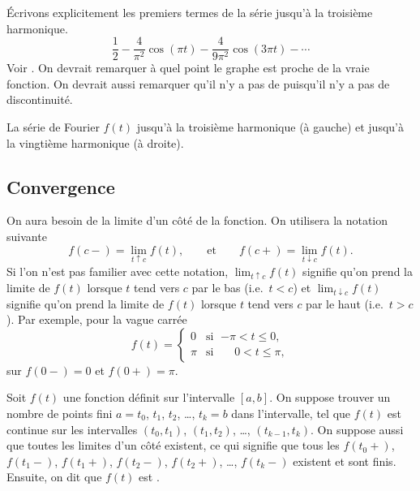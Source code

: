 \begin{example}
Écrivons explicitement les premiers termes de la série jusqu'à la troisième harmonique.
\begin{equation*}
\frac{1}{2} -
\frac{4}{\pi^2} \cos (\pi t)
-
\frac{4}{9 \pi^2} \cos (3 \pi t)
- \cdots
\end{equation*}
Voir .  On devrait remarquer à quel point le graphe est proche de la vraie fonction. On devrait aussi remarquer qu'il n'y a pas de 
 puisqu'il n'y a pas de discontinuité.

\begin{myfig}
\capstart
\caption{La série de Fourier $f(t)$ jusqu'à la troisième harmonique (à gauche)
et jusqu'à la vingtième harmonique (à droite).\label{gfs:sawcontfsfig}}
\end{myfig}
\end{example}

\subsection{Convergence}

On aura besoin de la limite d'un côté de la fonction. On utilisera la notation suivante 
\begin{equation*}
f(c-) = \lim_{t \uparrow c} f(t),
\qquad \text{et} \qquad
f(c+) = \lim_{t \downarrow c} f(t).
\end{equation*}
Si l'on n'est pas familier avec cette notation, 
$\lim_{t \uparrow c} f(t)$ signifie qu'on prend la limite de $f(t)$
lorsque $t$ tend vers $c$ par le bas (i.e.\ $t < c$) et
$\lim_{t \downarrow c} f(t)$ signifie qu'on prend la limite de $f(t)$
lorsque $t$ tend vers $c$ par le haut (i.e.\ $t > c$).
Par exemple, pour la vague carrée 
\begin{equation} \label{gfs:sqwaveeq}
f(t) =
\begin{cases}
0 & \text{si } \; {-\pi} < t \leq 0 , \\
\pi & \text{si } \; \phantom{-}0 < t \leq \pi ,
\end{cases}
\end{equation}
sur $f(0-) = 0$ et $f(0+) = \pi$.

Soit $f(t)$ une fonction définit sur l'intervalle $[a,b]$.  On suppose trouver un nombre de points fini 
$a=t_0$, $t_1$, $t_2$, \ldots, $t_k=b$ dans l'intervalle, tel que  $f(t)$ est continue sur les intervalles
  $(t_0,t_1)$, 
$(t_1,t_2)$, \ldots, 
$(t_{k-1},t_k)$.
On suppose aussi que toutes les limites d'un côté existent, ce qui signifie que tous les 
$f(t_0+)$,
$f(t_1-)$,
$f(t_1+)$,
$f(t_2-)$,
$f(t_2+)$,
\ldots,
$f(t_k-)$
existent et sont finis.
Ensuite, on dit que $f(t)$ est \emph{}.

